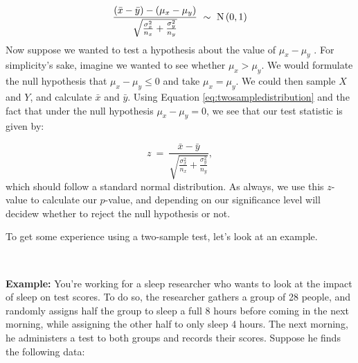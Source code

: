 \begin{equation} \label{eq:twosampledistribution}
\frac{\left(\bar{x} - \bar{y}\right) - \left(\mu_x - \mu_y \right)}{\sqrt{\frac{\sigma^2_x}{n_x} + \frac{\sigma^2_y}{n_y}}} \ \sim \  {\rm N}\left(0,1\right)
\end{equation}
Now suppose we wanted to test a hypothesis about the value of $\mu_x - \mu_y$  .  For simplicity's sake, imagine we wanted to see whether $\mu_x > \mu_y$.   We would formulate the null hypothesis that $\mu_x - \mu_y \leq 0$ and take $\mu_x = \mu_y$.  We could then sample $X$ and $Y$, and calculate $\bar{x}$ and $\bar{y}$.  Using Equation \ref{eq:twosampledistribution} and the fact that under the null hypothesis $\mu_x - \mu_y = 0$, we see that our test statistic is given by:

\begin{equation*}
z \ = \ \frac{\bar{x} - \bar{y}}{\sqrt{\frac{\sigma^2_x}{n_x} + \frac{\sigma^2_y}{n_y}}},
\end{equation*}
which should follow a standard normal distribution.  As always, we use this $z$-value to calculate our $p$-value, and depending on our significance level will decidew whether to reject the null hypothesis or not.

\begin{table}[h]
\begin{center}
\end{center}
\end{table}

To get some experience using a two-sample test, let's look at an example.

~

\textbf{Example:}  You're \ex working for a sleep researcher who wants to look at the impact of sleep on test scores. To do so, the researcher gathers a group of 28 people, and randomly assigns half the group to sleep a full 8 hours before coming in the next morning, while assigning the other half to only sleep 4 hours. The next morning, he administers a test to both groups and records their scores. Suppose he finds the following data:

